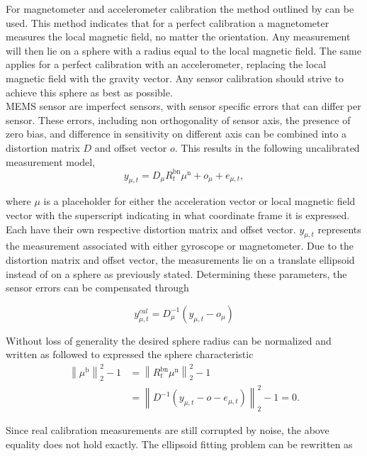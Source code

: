 For magnetometer and accelerometer calibration the method outlined by \citet{Kok2016} can be used. This method indicates that for a perfect calibration a magnetometer measures the local magnetic field, no matter the orientation. Any measurement will then lie on a sphere with a radius  equal to the local magnetic field. The same applies for a perfect calibration with an accelerometer, replacing the local magnetic field with the gravity vector. Any sensor calibration should strive to achieve this sphere as best as possible.\\
MEMS sensor are imperfect sensors, with sensor specific errors that can differ per sensor. These errors, including non orthogonality of sensor axis, the presence of zero bias, and difference in sensitivity on different axis \cite{Kok2016} can be combined into a distortion matrix $D$ and offset vector $o$.
This results in the following uncalibrated measurement model,
\begin{equation}
	y_{\mu, t}=D_\mu R_{t}^{\mathrm{bn}} \mu^{\mathrm{n}}+o_\mu +e_{\mu, t},
\end{equation}

where $\mu$ is a placeholder for either the acceleration vector or local magnetic field vector with the superscript indicating in what coordinate frame it is expressed. Each have their own respective distortion matrix and offset vector. $y_{\mu, t}$ represents the measurement associated with either gyroscope or magnetometer.
Due to the distortion matrix and offset vector, the measurements lie on a translate ellipsoid instead of on a sphere as previously stated. Determining these parameters, the sensor errors can be compensated through

\begin{equation}
	y_{\mu, t}^{cal}=D_\mu^{-1}\left(y_{\mu, t}-o_{\mu}\right)
\end{equation}

Without loss of generality the desired sphere radius can be normalized and written as followed to expressed the sphere characteristic
\begin{equation}
	\begin{aligned}
		\left\|\mu^{\mathrm{b}}\right\|_{2}^{2}-1 &=\left\|R_{t}^{\mathrm{bn}} \mu^{\mathrm{n}}\right\|_{2}^{2}-1 \\
		&=\left\|D^{-1}\left(y_{\mu, t}-o-e_{\mu, t}\right)\right\|_{2}^{2}-1=0.
	\end{aligned}
\end{equation}

Since real calibration measurements are still corrupted by noise, the above equality does not hold exactly. The ellipsoid fitting problem can be rewritten as

